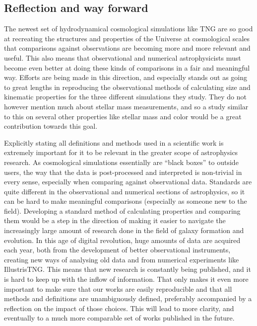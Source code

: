 \subsection{Reflection and way forward}
The newest set of hydrodynamical cosmological simulations like TNG are so good at recreating the structures and properties of the Universe at cosmological scales that comparisons against observations are becoming more and more relevant and useful. This also means that observational and numerical astrophysicists must become even better at doing these kinds of comparisons in a fair and meaningful way. Efforts are being made in this direction, and especially \textcite{Sande2018} stands out as going to great lengths in reproducing the observational methods of calculating size and kinematic properties for the three different simulations they study. They do not however mention much about stellar mass measurements, and so a study similar to this on several other properties like stellar mass and color would be a great contribution towards this goal.

Explicitly stating all definitions and methods used in a scientific work is extremely important for it to be relevant in the greater scope of astrophysics research. As cosmological simulations essentially are ``black boxes'' to outside users, the way that the data is post-processed and interpreted is non-trivial in every sense, especially when comparing against observational data. Standards are quite different in the observational and numerical sections of astrophysics, so it can be hard to make meaningful comparisons (especially as someone new to the field). Developing a standard method of calculating properties and comparing them would be a step in the direction of making it easier to navigate the increasingly large amount of research done in the field of galaxy formation and evolution. In this age of digital revolution, huge amounts of data are acquired each year, both from the development of better observational instruments, creating new ways of analysing old data and from numerical experiments like IllustrisTNG. This means that new research is constantly being published, and it is hard to keep up with the inflow of information. That only makes it even more important to make sure that our works are easily reproducible and that all methods and definitions are unambiguously defined, preferably accompanied by a reflection on the impact of those choices. This will lead to more clarity, and eventually to a much more comparable set of works published in the future.